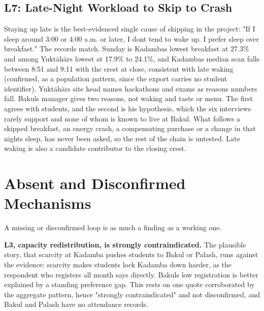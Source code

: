 \documentclass[
  10pt,
  table]{article}
\newcounter{none} %
\begin{document}
\subsection{L7: Late-Night Workload to Skip to Crash}\label{l7-late-night-workload-to-skip-to-crash}

Staying up late is the best-evidenced single cause of skipping in the project: "If I sleep around 3:00 or 4:00 a.m. or later, I don\textquotesingle t tend to wake up. I prefer sleep over breakfast." The records match. Sunday is Kadamba\textquotesingle s lowest breakfast at 27.3\% and among Yuktāhār\textquotesingle s lowest at 17.9\% to 24.1\%, and Kadamba\textquotesingle s median scan falls between 8:51 and 9:11 with the crest at close, consistent with late waking (confirmed, as a population pattern, since the export carries no student identifier). Yuktāhār\textquotesingle s site head names hackathons and exams as reasons numbers fall. Bakul\textquotesingle s manager gives two reasons, not waking and taste or menu. The first agrees with students, and the second is his hypothesis, which the six interviews rarely support and none of whom is known to live at Bakul. What follows a skipped breakfast, an energy crash, a compensating purchase or a change in that night\textquotesingle s sleep, has never been asked, so the rest of the chain is untested. Late waking is also a candidate contributor to the closing crest.

\section{Absent and Disconfirmed Mechanisms}\label{absent-and-disconfirmed-mechanisms}

A missing or disconfirmed loop is as much a finding as a working one.

\textbf{L3, capacity redistribution, is strongly contraindicated.} The plausible story, that scarcity at Kadamba pushes students to Bakul or Palash, runs against the evidence: scarcity makes students lock Kadamba down harder, as the respondent who registers all month says directly. Bakul\textquotesingle s low registration is better explained by a standing preference gap. This rests on one quote corroborated by the aggregate pattern, hence "strongly contraindicated" and not disconfirmed, and Bakul and Palash have no attendance records.
\end{document}
